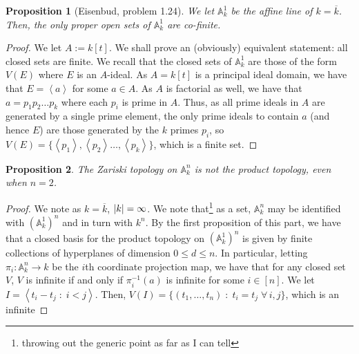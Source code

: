 \documentclass[english]{article}
\DeclarePairedDelimiter\abs{\lvert}{\rvert}%
\renewcommand{\AA}{\mathbb{A}}
\newtheorem*{prop*}{Proposition}
\theoremstyle{remark}
\theoremstyle{definition}
\newcommand{\idl}[1]{\left\langle{#1}\right\rangle }
\newcommand{\acl}{\overline}
\begin{document}
\begin{prop*}[Eisenbud, problem 1.24]
	We let $\AA_k^1$ be the affine line of $k=\acl{k}$. Then, the only proper open sets of $\AA_k^1$ are co-finite. 
\end{prop*}
\begin{proof} We let $A:=k[t]$.
	We shall prove an (obviously) equivalent statement: all closed sets are finite. We recall that the closed sets of $\AA_k^1$ are those of the form $V(E)$ where $E$ is an $A$-ideal. As $A=k[t]$ is a principal ideal domain, we have that $E=\idl{a}$ for some $a\in A$. As $A$ is factorial as well, we have that $a=p_1p_2\hdots p_k$ where each $p_i$ is prime in $A$. Thus, as all prime ideals in $A$ are generated by a single prime element, the only prime ideals to contain $a$ (and hence $E$) are those generated by the $k$ primes $p_i$, so $V(E)=\{\idl{p_1},\idl{p_2}\hdots,\idl{p_k}\}$, which is a finite set. 
	\end{proof}
\begin{prop*}
	The Zariski topology on $\AA_k^n$ is not the product topology, even when $n=2$. 
\end{prop*}
\begin{proof}
	We note as $k=\overline{k}$, $\abs{k}=\infty$. We note that\footnote{throwing out the generic point as far as I can tell\textellipsis} as a set, $\AA_k^n$ may be identified with $(\AA_k^1)^n$ and in turn with $k^n$. By the first proposition of this part, we have that a closed basis for the product topology on $(\AA_k^1)^n$ is given by finite collections of hyperplanes of dimension $0\leq d\leq n$. In particular, letting $\pi_i:\AA^n_k\to k$ be the $i$th coordinate projection map, we have that for any closed set $V$, $V$ is infinite if and only if $\pi_i^{-1}(a)$ is infinite for some $i\in [n]$. We let $I=\idl{t_i-t_j\;:\;i<j}$. Then, $V(I)=\{(t_1,\hdots,t_n)\;:\;t_i=t_j \;\forall\, i,j\}$, which is an infinite 
\end{proof}
\end{document}

